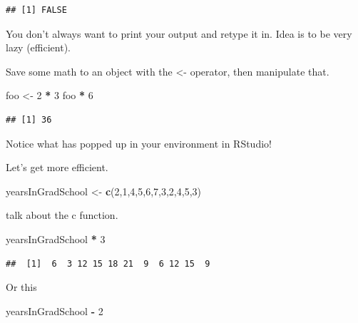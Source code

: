 \documentclass[]{book}
\newenvironment{Shaded}{\begin{snugshade}}{\end{snugshade}}
\newcommand{\KeywordTok}[1]{\textcolor[rgb]{0.13,0.29,0.53}{\textbf{#1}}}
\newcommand{\DecValTok}[1]{\textcolor[rgb]{0.00,0.00,0.81}{#1}}
\newcommand{\StringTok}[1]{\textcolor[rgb]{0.31,0.60,0.02}{#1}}
\newcommand{\OperatorTok}[1]{\textcolor[rgb]{0.81,0.36,0.00}{\textbf{#1}}}
\newcommand{\NormalTok}[1]{#1}
\theoremstyle{definition}
\theoremstyle{definition}
\theoremstyle{definition}
\theoremstyle{remark}
\begin{document}
\begin{verbatim}
## [1] FALSE
\end{verbatim}

You don't always want to print your output and retype it in. Idea is to
be very lazy (efficient).

Save some math to an object with the \textless{}- operator, then
manipulate that.

\begin{Shaded}
\begin{Highlighting}[]
\NormalTok{foo <-}\StringTok{ }\DecValTok{2} \OperatorTok{*}\StringTok{ }\DecValTok{3}
\NormalTok{foo }\OperatorTok{*}\StringTok{ }\DecValTok{6}
\end{Highlighting}
\end{Shaded}

\begin{verbatim}
## [1] 36
\end{verbatim}

Notice what has popped up in your environment in RStudio!

Let's get more efficient.

\begin{Shaded}
\begin{Highlighting}[]
\NormalTok{yearsInGradSchool <-}\StringTok{ }\KeywordTok{c}\NormalTok{(}\DecValTok{2}\NormalTok{,}\DecValTok{1}\NormalTok{,}\DecValTok{4}\NormalTok{,}\DecValTok{5}\NormalTok{,}\DecValTok{6}\NormalTok{,}\DecValTok{7}\NormalTok{,}\DecValTok{3}\NormalTok{,}\DecValTok{2}\NormalTok{,}\DecValTok{4}\NormalTok{,}\DecValTok{5}\NormalTok{,}\DecValTok{3}\NormalTok{)}
\end{Highlighting}
\end{Shaded}

talk about the c function.

\begin{Shaded}
\begin{Highlighting}[]
\NormalTok{yearsInGradSchool }\OperatorTok{*}\StringTok{ }\DecValTok{3}
\end{Highlighting}
\end{Shaded}

\begin{verbatim}
##  [1]  6  3 12 15 18 21  9  6 12 15  9
\end{verbatim}

Or this

\begin{Shaded}
\begin{Highlighting}[]
\NormalTok{yearsInGradSchool }\OperatorTok{-}\StringTok{ }\DecValTok{2}
\end{Highlighting}
\end{Shaded}
\end{document}
